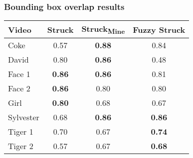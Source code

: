 \begin{frame}
    \frametitle{Bounding box overlap results}
    \begin{center}
        \begin{tabular}{l c c c }
            \toprule
            Video & Struck\textsubscript{\cite{6126251}} & Struck\textsubscript{Mine} & Fuzzy Struck \\
            \midrule
            Coke      &         0.57  & \textbf{0.88} &         0.84  \\
            David     &         0.80  & \textbf{0.86} &         0.48  \\
            Face 1    & \textbf{0.86} & \textbf{0.86} &         0.81  \\
            Face 2    & \textbf{0.86} &         0.80  &         0.80  \\
            Girl      & \textbf{0.80} &         0.68  &         0.67  \\
            Sylvester &         0.68  & \textbf{0.86} & \textbf{0.86} \\
            Tiger 1   &         0.70  &         0.67  & \textbf{0.74} \\
            Tiger 2   &         0.57  &         0.67  & \textbf{0.68} \\
            \bottomrule
        \end{tabular}
    \end{center}
\end{frame}

